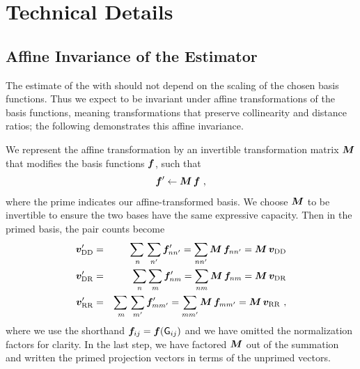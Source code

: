 \section{Technical Details}

\subsection{Affine Invariance of the Estimator}\label{sec:affine}

The estimate of the \cf with \est should not depend on the scaling of the chosen basis functions.
Thus we expect \est to be invariant under affine transformations of the basis functions, meaning transformations that preserve collinearity and distance ratios; the following demonstrates this affine invariance.

We represent the affine transformation by an invertible transformation matrix $\bm{M}$ that modifies the basis functions $\bm{f}$, such that 
\begin{equation}
\bm{f}' \leftarrow \bm{M}\,\bm{f} ~,
\end{equation}
where the prime indicates our affine-transformed basis.
We choose $\bm{M}$ to be invertible to ensure the two bases have the same expressive capacity.
Then in the primed basis, the pair counts become
\begin{eqnarray}\displaystyle
\vv{DD}' &=& \adjustlimits \sum_{n} \sum_{n'} \ff_{n n'}' = \sum_{n n'} \bld{M}\,\ff_{n n'} = \bld{M}\,\vv{DD}
\\
\vv{DR}' &=& \sum_{n} \sum_{m} \ff_{n m}' = \sum_{n m} \bld{M}\,\ff_{n m} = \bld{M}\,\vv{DR}
\\
\vv{RR}' &=& \adjustlimits \sum_{m} \sum_{m'} \ff_{m m'}' = \sum_{m m'} \bld{M}\,\ff_{m m'} = \bld{M}\,\vv{RR} ~,
\end{eqnarray}
where we use the shorthand $\bm{f}_{i j} = \bm{f}(\mathsf{G}_{i j})$ and we have omitted the normalization factors for clarity.
In the last step, we have factored $\bm{M}$ out of the summation and written the primed projection vectors in terms of the unprimed vectors. 


